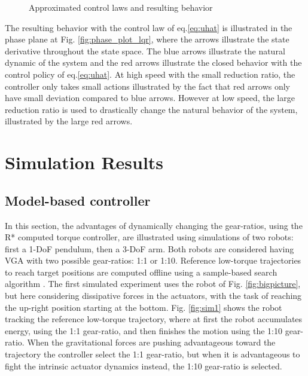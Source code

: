 \begin{figure}[htpb]
				\vspace{-10pt}
        \centering
        \caption{Approximated control laws and resulting behavior}\label{fig:approx}
\end{figure}


The resulting behavior with the control law of eq.\eqref{eq:uhat} is illustrated in the phase plane at Fig. \ref{fig:phase_plot_lqr}, where the arrows illustrate the state derivative throughout the state space. The blue arrows illustrate the natural dynamic of the system and the red arrows illustrate the closed behavior with the control policy of eq.\eqref{eq:uhat}. At high speed with the small reduction ratio, the controller only takes small actions illustrated by the fact that red arrows only have small deviation compared to blue arrows. However at low speed, the large reduction ratio is used to drastically change the natural behavior of the system, illustrated by the large red arrows. 



\section{Simulation Results}
\label{sec:shift_sim}



\subsection{Model-based controller}


In this section, the advantages of dynamically changing the gear-ratios, using the R* computed torque controller, are illustrated using simulations of two robots: first a 1-DoF pendulum, then a 3-DoF arm. Both robots are considered having VGA with two possible gear-ratios: 1:1 or 1:10. Reference low-torque trajectories to reach target positions are computed offline using a sample-based search algorithm \cite{lavalle_planning_2006}. 
%
The first simulated experiment uses the robot of Fig. \ref{fig:bigpicture}, but here considering dissipative forces in the actuators, with the task of reaching the up-right position starting at the bottom. Fig. \ref{fig:sim1} shows the robot tracking the reference low-torque trajectory, where at first the robot accumulates energy, using the 1:1 gear-ratio, and then finishes the motion using the 1:10 gear-ratio. When the gravitational forces are pushing advantageous toward the trajectory the controller select the 1:1 gear-ratio, but when it is advantageous to fight the intrinsic actuator dynamics instead, the 1:10 gear-ratio is selected. 

